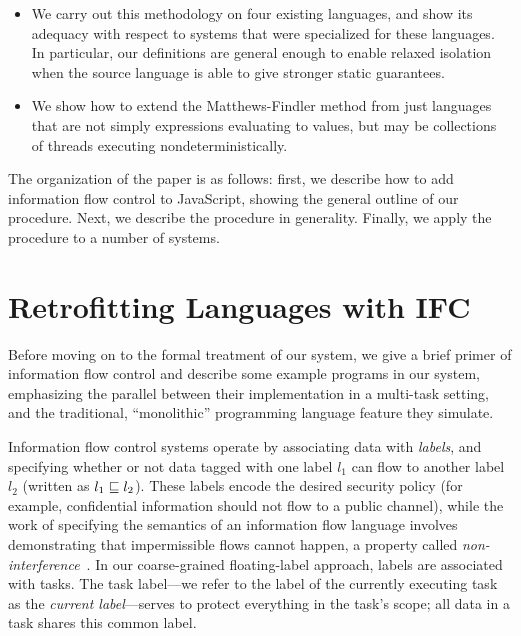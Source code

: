 \documentclass{llncs}
\begin{document}
{\begin{itemize}
    \item We carry out this methodology on four existing languages, and
        show its adequacy with respect to systems that were specialized
        for these languages.  In particular, our definitions are general
        enough to enable relaxed isolation when the source language is
        able to give stronger static guarantees.

    \item We show how to extend the Matthews-Findler method from just
        languages that are not simply expressions evaluating to values,
        but may be collections of threads executing nondeterministically.
\end{itemize}

The organization of the paper is as follows: first, we describe how to
add information flow control to JavaScript, showing the general outline of
our procedure. Next, we describe the procedure in generality.  Finally, we
apply the procedure to a number of systems.
}
\section{Retrofitting Languages with IFC}
\label{sec:retrofit}

Before moving on to the formal treatment of our system, we give
a brief primer of information flow control and describe some example programs
in our system, emphasizing the parallel between their implementation
in a multi-task setting, and the traditional, ``monolithic'' programming
language feature they simulate.

Information flow control systems operate by associating data with \emph{labels},
and specifying whether or not data tagged with one label \ensuremath{l_{1}} can flow
to another
label \ensuremath{l_{2}} (written as \ensuremath{l_{1}\flows{}l_{2}}).  These labels encode the desired
security policy (for example, confidential information should not flow to
a public channel), while the work of specifying the semantics of an information
flow language involves demonstrating that impermissible flows cannot happen,
a property called \emph{non-interference}~\cite{Goguen82}.
In our coarse-grained floating-label approach, labels are associated with tasks.
The task label---we refer to the label of the currently executing task as the
\emph{current label}---serves to protect everything in the task's scope;
all data in a task shares this common label.
\end{document}
